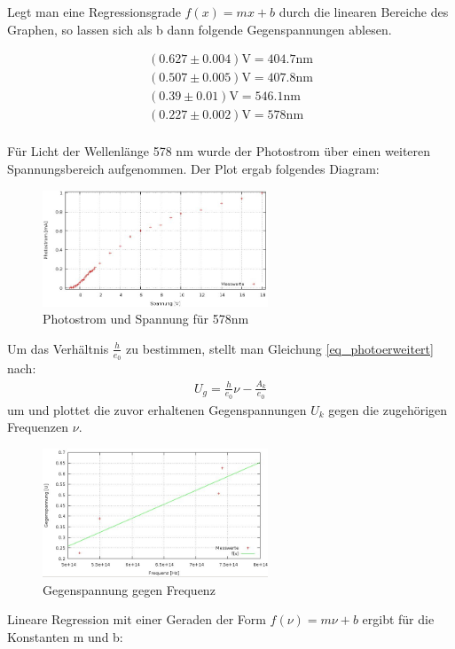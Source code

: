 Legt man eine Regressionsgrade $f(x) = mx + b$ durch die linearen Bereiche des Graphen, so lassen sich als b dann folgende Gegenspannungen ablesen.

\begin{align*}
(0.627 \pm0.004)\text{V}	=	404.7\text{nm}\\
(0.507\pm 0.005)\text{V}	=	407.8\text{nm}\\
(0.39\pm0.01)\text{V}	=	546.1\text{nm}\\
(0.227\pm0.002)\text{V}	=	578\text{nm}\\
\end{align*}

Für Licht der Wellenlänge 578 nm wurde der Photostrom über einen weiteren Spannungsbereich aufgenommen. Der Plot ergab folgendes Diagram:

\begin{figure}[H]
\includegraphics[width=0.6\textwidth]{pics/gesamt.jpg}
\caption{Photostrom und Spannung für 578nm}
\end{figure}

Um das Verhältnis $\frac{h}{e_0}$ zu bestimmen, stellt man Gleichung \eqref{eq_photoerweitert} nach:
\begin{align*}
U_g = \frac{h}{e_0}\nu - \frac{A_k}{e_0}
\end{align*}
um und plottet die zuvor erhaltenen Gegenspannungen $U_k$ gegen die zugehörigen Frequenzen $\nu$. 

\begin{figure}[H]
\includegraphics[width=0.6\textwidth]{pics/4werte.jpg}
\caption{Gegenspannung gegen Frequenz}
\end{figure} 
Lineare Regression mit einer Geraden der Form $f(\nu)=m\nu + b$ ergibt für die Konstanten m und b:


